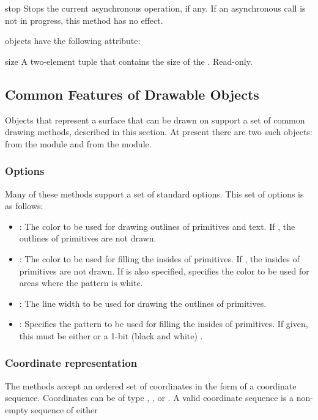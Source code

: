 \begin{methoddesc}[Image]{stop}{}
Stops the current asynchronous operation, if any. If an asynchronous call is 
not in progress, this method has no effect.
\end{methoddesc}

 objects have the following attribute:

\begin{memberdesc}[Image]{size}
A two-element tuple that contains the size of the . Read-only.
\end{memberdesc}

\subsection{Common Features of Drawable Objects}
\label{subsec:common}
Objects that represent a surface that can be drawn on support a set of 
common drawing methods, described in this section. At present there are two 
such objects:  from the  module and 
 from the  module. 

\subsubsection{Options}
\label{subsubsec:options}
Many of these methods support a set of standard options. This set of options 
is as follows:

\begin{itemize}
\item {}: The color to be used for drawing outlines of primitives and text. If , the outlines of primitives are not drawn.
\item {}: The color to be used for filling the insides of primitives. If , the insides of primitives are not drawn. If  is also specified,  specifies the color to be used for areas where the pattern is white.
\item {}: The line width to be used for drawing the outlines of primitives.
\item {}: Specifies the pattern to be used for filling the insides of primitives. If given, this must be either  or a 1-bit (black and white) .
\end{itemize}

\subsubsection{Coordinate representation}
\label{subsubsec:coordinate}
The methods accept an ordered set of coordinates in the form of a coordinate 
sequence. Coordinates can be of type , , or 
. A valid coordinate sequence is a non-empty sequence of 
either

